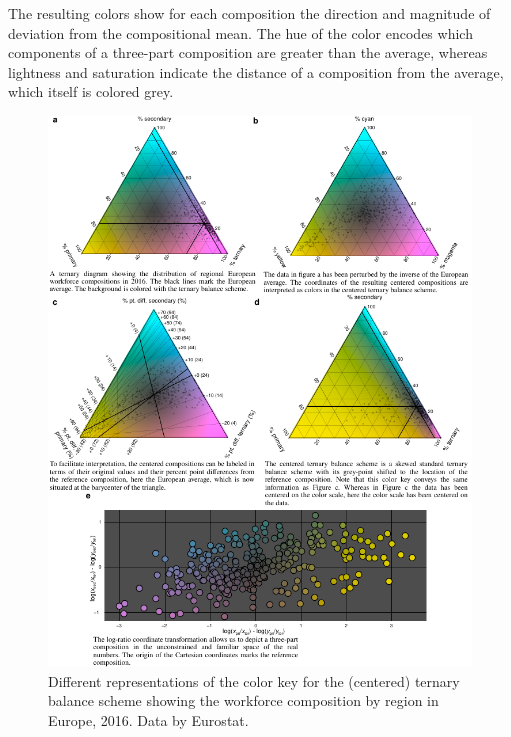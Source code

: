 \documentclass[10pt,twoside,reqno]{article}
\makeatletter
\def\cnstmaxfigwidth{
      \ifdim \Gin@nat@width>\linewidth
        \linewidth
      \else \Gin@nat@width
      \fi
    }
\let\Oldincludegraphics\includegraphics
\renewcommand{\includegraphics}[1]{\Oldincludegraphics[width=\cnstmaxfigwidth]{#1}}
\makeatother
\begin{document}
The resulting colors show for each composition the direction and
magnitude of deviation from the compositional mean. The hue of the color
encodes which components of a three-part composition are greater than
the average, whereas lightness and saturation indicate the distance of a
composition from the average, which itself is colored grey.

\begin{figure}
\centering
\includegraphics{figure3.pdf}
\caption{Different representations of the color key for the (centered)
ternary balance scheme showing the workforce composition by region in
Europe, 2016. Data by Eurostat.}
\end{figure}
\end{document}
